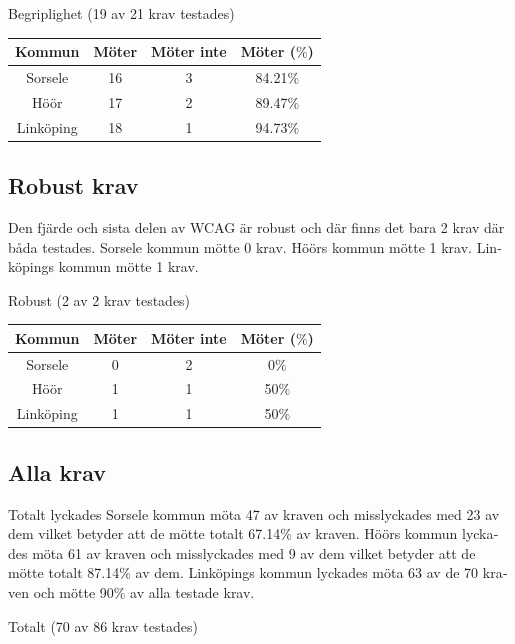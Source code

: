\documentclass[11p]{article}
\begin{document}
\begin{otherlanguage}{swedish}
    \begin{center}
    Begriplighet (19 av 21 krav testades)

    \begin{tabular}{ |c|c|c|c|}
        \hline
        Kommun & Möter & Möter inte & Möter ($\%$) \\  \hline
        Sorsele & 16 & 3 & 84.21$\%$ \\ \hline
        Höör & 17 & 2 & 89.47$\%$ \\ \hline
        Linköping & 18 & 1 & 94.73$\%$ \\ \hline
    \end{tabular}
    \end{center}

    \subsection{Robust krav}
    Den fjärde och sista delen av WCAG är robust och där finns det bara 2 krav där båda testades.
    Sorsele kommun mötte 0 krav.
    Höörs kommun mötte 1 krav.
    Linköpings kommun mötte 1 krav.

    \begin{center}
    Robust (2 av 2 krav testades)

    \begin{tabular}{ |c|c|c|c|}
        \hline
        Kommun & Möter & Möter inte & Möter ($\%$) \\  \hline
        Sorsele & 0 & 2 & 0$\%$ \\ \hline
        Höör & 1 & 1 & 50$\%$ \\ \hline
        Linköping & 1 & 1 & 50$\%$ \\ \hline
    \end{tabular}
    \end{center}
    
    \subsection{Alla krav}
    Totalt lyckades Sorsele kommun möta 47 av kraven och misslyckades med 23 av dem vilket betyder att de mötte totalt 67.14$\%$ av kraven.
    Höörs kommun lyckades möta 61 av kraven och misslyckades med 9 av dem vilket betyder att de mötte totalt 87.14$\%$ av dem.
    Linköpings kommun lyckades möta 63 av de 70 kraven och mötte 90$\%$ av alla testade krav.

    \begin{center}
    Totalt (70 av 86 krav testades)


\end{center}
\end{otherlanguage}
\end{document}
